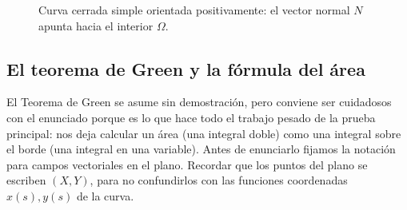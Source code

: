 \documentclass[12pt,a4paper]{article}
\theoremstyle{profesional}
\theoremstyle{definicion-style}
\begin{document}
\begin{figure}[ht]
    \centering
    \caption{Curva cerrada simple orientada positivamente: el vector normal \( N \) apunta hacia el interior \( \Omega \).}
\end{figure}

\subsection{El teorema de Green y la fórmula del área}

El Teorema de Green se asume sin demostración, pero conviene ser cuidadosos con el enunciado porque es lo que hace todo el trabajo pesado de la prueba principal: nos deja calcular un área (una integral doble) como una integral sobre el borde (una integral en una variable).
Antes de enunciarlo fijamos la notación para campos vectoriales en el plano. Recordar que los puntos del plano se escriben \( (X, Y) \), para no confundirlos con las funciones coordenadas \( x(s), y(s) \) de la curva.
\end{document}
